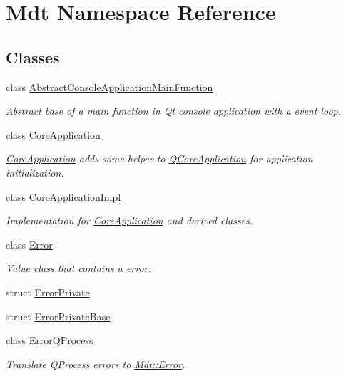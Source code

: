 \hypertarget{namespace_mdt}{}\section{Mdt Namespace Reference}
\label{namespace_mdt}
\subsection*{Classes}
\begin{DoxyCompactItemize}
\item 
class \hyperlink{class_mdt_1_1_abstract_console_application_main_function}{Abstract\+Console\+Application\+Main\+Function}
\begin{DoxyCompactList}\small\item\em Abstract base of a main function in Qt console application with a event loop. \end{DoxyCompactList}\item 
class \hyperlink{class_mdt_1_1_core_application}{Core\+Application}
\begin{DoxyCompactList}\small\item\em \hyperlink{class_mdt_1_1_core_application}{Core\+Application} adds some helper to \hyperlink{class_q_core_application}{Q\+Core\+Application} for application initialization. \end{DoxyCompactList}\item 
class \hyperlink{class_mdt_1_1_core_application_impl}{Core\+Application\+Impl}
\begin{DoxyCompactList}\small\item\em Implementation for \hyperlink{class_mdt_1_1_core_application}{Core\+Application} and derived classes. \end{DoxyCompactList}\item 
class \hyperlink{class_mdt_1_1_error}{Error}
\begin{DoxyCompactList}\small\item\em Value class that contains a error. \end{DoxyCompactList}\item 
struct \hyperlink{struct_mdt_1_1_error_private}{Error\+Private}
\item 
struct \hyperlink{struct_mdt_1_1_error_private_base}{Error\+Private\+Base}
\item 
class \hyperlink{class_mdt_1_1_error_q_process}{Error\+Q\+Process}
\begin{DoxyCompactList}\small\item\em Translate Q\+Process errors to \hyperlink{class_mdt_1_1_error}{Mdt\+::\+Error}. \end{DoxyCompactList}\item 

\end{DoxyCompactItemize}
